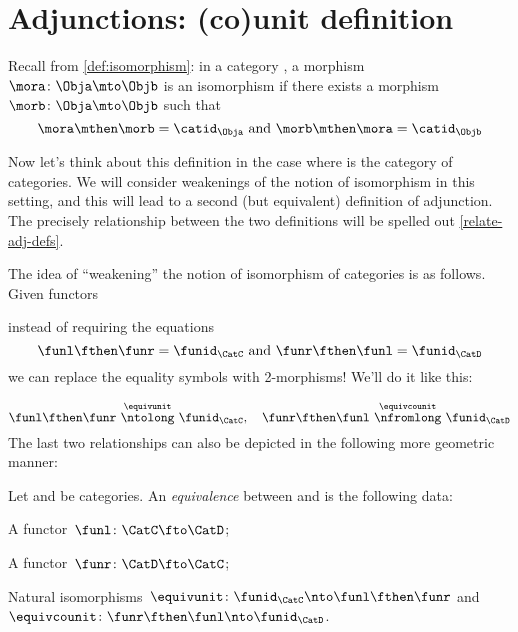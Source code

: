\section{Adjunctions: (co)unit definition}

Recall from \cref{def:isomorphism}: in a category \CatC, a morphism~$\mora \colon \Obja \mto \Objb$ is an isomorphism if there exists a morphism~$\morb \colon \Obja \mto \Objb$ such that
\begin{equation*}
  \mora \mthen \morb = \catid_\Obja \text{ and } \morb \mthen \mora = \catid_\Objb
\end{equation*}

Now let's think about this definition in the case where \CatC is the category \Category of categories. We will consider weakenings of the notion of isomorphism in this setting, and this will lead to a second (but equivalent) definition of adjunction. The precisely relationship between the two definitions will be spelled out \cref{relate-adj-defs}.

The idea of ``weakening'' the notion of isomorphism of categories is as follows. Given functors
\begin{center}
\end{center}
instead of requiring the equations
\begin{equation*}
  \funl \fthen \funr = \funid_\CatC  \text{ and } \funr \fthen \funl = \funid_\CatD
\end{equation*}
we can replace the equality symbols with 2-morphisms! We'll do it like this:

\begin{equation*}
  \funl \fthen \funr \ \overset{\equivunit}{\ntolong}\  \funid_\CatC, \quad  \funr \fthen \funl \ \overset{\equivcounit}{\nfromlong}\  \funid_\CatD
\end{equation*}
The last two relationships can also be depicted in the following more geometric manner:
\begin{center}
  \hspace{1cm}
\end{center}

\begin{ctdefinition}
  \label{def:cat-equivalence}
  Let \CatC and \CatD be categories. An \emph{equivalence} between \CatC and \CatD is the following data:
  \begin{compactenum}
    \item A functor~$\funl \colon \CatC \fto \CatD$;
    \item A functor~$\funr \colon \CatD \fto \CatC$;
    \item Natural isomorphisms~$\equivunit \colon \funid_\CatC \nto \funl \fthen \funr$ and~$\equivcounit \colon  \funr \fthen \funl \nto \funid_\CatD$.
  \end{compactenum}
\end{ctdefinition}

